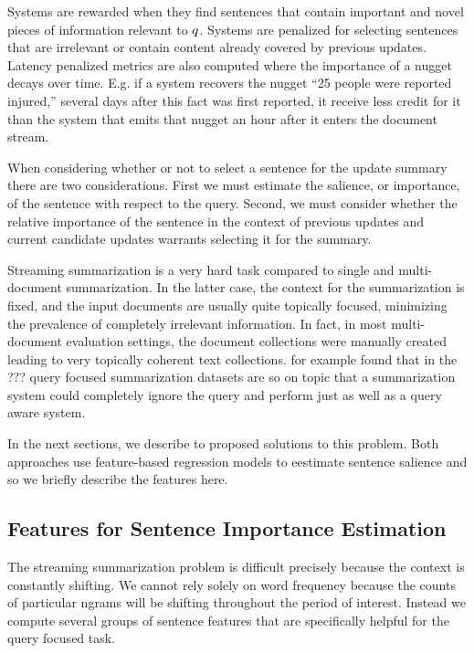 Systems are rewarded when they find sentences that contain important and novel
pieces of information relevant to $q$. Systems are penalized for 
selecting sentences that are irrelevant or contain content already covered
by previous updates. Latency penalized metrics are also computed where
the importance of a nugget decays over time. E.g. if a system
recovers the nugget ``25 people were reported injured,'' several days
after this fact was first reported, it receive less credit for it
than the system that emits that nugget an hour after it enters the 
document stream.


When considering whether or not to select a sentence for the update summary
there are two considerations. First we must estimate the salience, or 
importance, of the sentence with respect to the query. Second, we must consider
whether the relative importance of the sentence in the context of previous
updates and current candidate updates warrants selecting it for the summary.

Streaming summarization is a very hard task compared to single and 
multi-document summarization. In the latter case, the context for the 
summarization is fixed, and the input documents are usually quite 
topically focused, minimizing the prevalence of completely irrelevant 
information. In fact, in most multi-document evaluation settings, the
document collections were manually created leading to very topically
coherent text collections. 
\cite{that_guy_who_presented_once} for example found that in the ???
query focused summarization datasets are so on topic that a summarization
system could completely ignore the query and perform just as well as a
query aware system.





In the next sections, we describe to proposed solutions to this problem.
Both approaches use feature-based regression models to eestimate sentence
salience and so we briefly describe the features here.

\subsection{Features for Sentence Importance Estimation}

The streaming summarization problem is difficult precisely because the context
is constantly shifting. We cannot rely solely on word frequency because
the counts of particular ngrams will be shifting throughout the period of 
interest. Instead we compute several groups of sentence features that are
specifically helpful for the query focused task.


